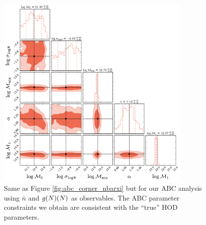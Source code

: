 \begin{figure}
\includegraphics[width=0.85\textwidth]{figures/abc/paper_ABCcorner_nbargmf.pdf}
\caption{\label{fig:abc_corner_nbargmf}Same as Figure \ref{fig:abc_corner_nbarxi} but for our ABC analysis using $\bar{n}$ and $g(N)(N)$ as observables. The ABC parameter constraints we obtain are
consistent with the ``true'' HOD parameters.}
\end{figure}

